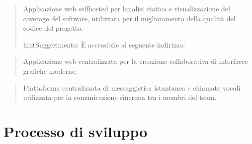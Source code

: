 \documentclass[letterpaper,10pt,italian]{sphinxmanual}
\begin{document}
\sphinxAtStartPar
{}
\begin{quote}

\sphinxAtStartPar
Applicazione web self\sphinxhyphen{}hosted per l\textquotesingle{}analisi statica e visualizzazione del coverage del software, utilizzata per
il miglioramento della qualità del codice del progetto.

\begin{sphinxadmonition}{hint}{Suggerimento:}
\sphinxAtStartPar
È accessibile al seguente indirizzo: 
\end{sphinxadmonition}
\end{quote}

\sphinxAtStartPar
{}
\begin{quote}

\sphinxAtStartPar
Applicazione web centralizzata per la creazione collaborativa di interfacce grafiche moderne.
\end{quote}

\sphinxAtStartPar
{}
\begin{quote}

\sphinxAtStartPar
Piattaforma centralizzata di messaggistica istantanea e chiamate vocali utilizzata per la comunicazione sincrona
tra i membri del team.
\end{quote}


\chapter{Processo di sviluppo}
\label{\detokenize{development/process:processo-di-sviluppo}}\label{\detokenize{development/process::doc}}
\end{document}
